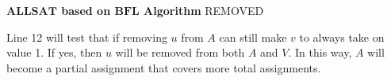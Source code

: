 \documentclass[journal]{IEEEtran}
\begin{document}
\begin{algo}
\textbf{$\boldsymbol{ALLSAT}$ based on $\boldsymbol{BFL}$ Algorithm}
REMOVED
\end{algo}

\vspace{0.2cm}

Line 12 will test that if removing $u$ from $A$ can still make $v$ to always take on value 1.
If yes, then $u$ will be removed from both $A$ and $V$.
In this way, $A$ will become a partial assignment that covers more total assignments.
\end{document}
